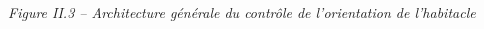 \documentclass[10pt,fleqn]{article} %
\begin{document}
\begin{multicols}{2}
\begin{center}
\textit{Figure II.3 – Architecture générale du contrôle de l’orientation de l’habitacle}
\end{center}

%
%
%
%
%
%
%
%
%



\end{multicols}
\end{document}
